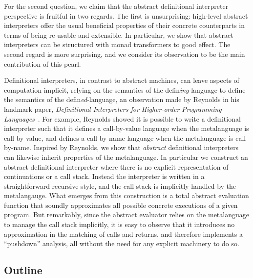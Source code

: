 For the second question, we claim that the abstract definitional
interpreter perspective is fruitful in two regards.  The first is
unsurprising: high-level abstract interpreters offer the usual
beneficial properties of their concrete counterparts in terms of being
re-usable and extensible.  In particular, we show that abstract
interpreters can be structured with monad transformers to good effect.
The second regard is more surprising, and we consider its observation
to be the main contribution of this pearl.

Definitional interpreters, in contrast to abstract machines, can leave
aspects of computation implicit, relying on the semantics of the
defin\emph{ing}-language to define the semantics of the
defin\emph{ed}-language, an observation made by Reynolds in his landmark
paper, \emph{Definitional Interpreters for Higher-order Programming
  Languages}~\cite{dvanhorn:reynolds-acm72}.  For example, Reynolds showed it is
possible to write a definitional interpreter such that it defines a
call-by-value language when the metalanguage is call-by-value, and
defines a call-by-name language when the metalanguage is call-by-name.
Inspired by Reynolds, we show that \emph{abstract} definitional interpreters can likewise
inherit properties of the metalanguage.  In particular we construct an
abstract definitional interpreter where there is no explicit
representation of continuations or a call stack.  Instead the
interpreter is written in a straightforward recursive style, and the
call stack is implicitly handled by the metalangauge.  What emerges
from this construction is a total abstract evaluation function that
soundly approximates all possible concrete executions of a given
program.  But remarkably, since the abstract evaluator relies on the
metalanguage to manage the call stack implicitly, it is easy to
observe that it introduces no approximation in the matching of calls
and returns, and therefore implements a ``pushdown'' analysis, all
without the need for any explicit machinery to do so.

\subsection*{Outline}

